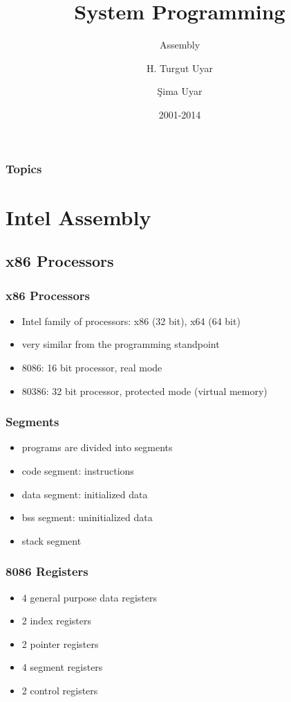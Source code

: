 \documentclass[dvipsnames]{beamer}
\title{System Programming}
\subtitle{Assembly}
\author{H. Turgut Uyar \and Şima Uyar}
\date{2001-2014}
\begin{document}
\begin{frame}
  \titlepage
\end{frame}

\begin{frame}
  \frametitle{Topics}
  \tableofcontents
\end{frame}

\section{Intel Assembly}

\subsection{x86 Processors}

\begin{frame}[fragile]
  \frametitle{x86 Processors}

  \begin{itemize}
    \item Intel family of processors: x86 (32 bit), x64 (64 bit)

    \medskip
    \item very similar from the programming standpoint
    \item 8086: 16 bit processor, real mode
    \item 80386: 32 bit processor, protected mode (virtual memory)
  \end{itemize}
\end{frame}

\begin{frame}
  \frametitle{Segments}

  \begin{itemize}
    \item programs are divided into \alert{segments}

    \medskip
    \item \alert{code} segment: instructions
    \item \alert{data} segment: initialized data
    \item \alert{bss} segment: uninitialized data
    \item \alert{stack} segment
  \end{itemize}
\end{frame}

\begin{frame}
  \frametitle{8086 Registers}

  \begin{itemize}
    \item 4 general purpose data registers
    \item 2 index registers
    \item 2 pointer registers
    \item 4 segment registers
    \item 2 control registers
  \end{itemize}
\end{frame}
\end{document}
